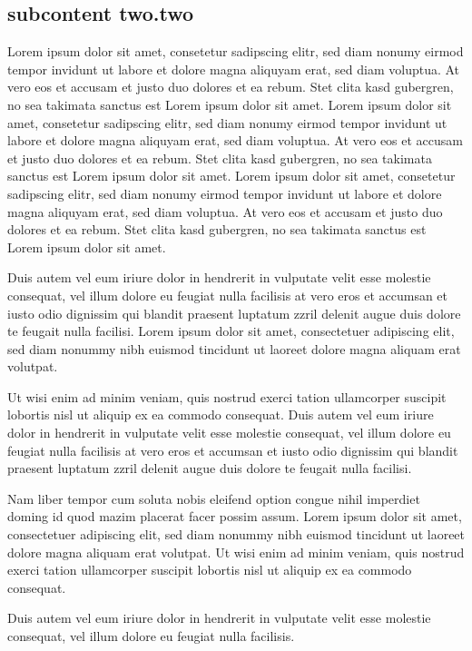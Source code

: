  \subsection{subcontent two.two}   

Lorem ipsum dolor sit amet, consetetur sadipscing elitr, sed diam nonumy eirmod
tempor invidunt ut labore et dolore magna aliquyam erat, sed diam voluptua. At
vero eos et accusam et justo duo dolores et ea rebum. Stet clita kasd gubergren,
no sea takimata sanctus est Lorem ipsum dolor sit amet. Lorem ipsum dolor sit
amet, consetetur sadipscing elitr, sed diam nonumy eirmod tempor invidunt ut
labore et dolore magna aliquyam erat, sed diam voluptua. At vero eos et accusam
et justo duo dolores et ea rebum. Stet clita kasd gubergren, no sea takimata
sanctus est Lorem ipsum dolor sit amet. Lorem ipsum dolor sit amet, consetetur
sadipscing elitr, sed diam nonumy eirmod tempor invidunt ut labore et dolore
magna aliquyam erat, sed diam voluptua. At vero eos et accusam et justo duo
dolores et ea rebum. Stet clita kasd gubergren, no sea takimata sanctus est
Lorem ipsum dolor sit amet.

Duis autem vel eum iriure dolor in hendrerit in vulputate velit esse molestie
consequat, vel illum dolore eu feugiat nulla facilisis at vero eros et accumsan
et iusto odio dignissim qui blandit praesent luptatum zzril delenit augue duis
dolore te feugait nulla facilisi. Lorem ipsum dolor sit amet, consectetuer
adipiscing elit, sed diam nonummy nibh euismod tincidunt ut laoreet dolore magna
aliquam erat volutpat.

Ut wisi enim ad minim veniam, quis nostrud exerci tation ullamcorper suscipit
lobortis nisl ut aliquip ex ea commodo consequat. Duis autem vel eum iriure
dolor in hendrerit in vulputate velit esse molestie consequat, vel illum dolore
eu feugiat nulla facilisis at vero eros et accumsan et iusto odio dignissim qui
blandit praesent luptatum zzril delenit augue duis dolore te feugait nulla
facilisi.

Nam liber tempor cum soluta nobis eleifend option congue nihil imperdiet doming
id quod mazim placerat facer possim assum. Lorem ipsum dolor sit amet,
consectetuer adipiscing elit, sed diam nonummy nibh euismod tincidunt ut laoreet
dolore magna aliquam erat volutpat. Ut wisi enim ad minim veniam, quis nostrud
exerci tation ullamcorper suscipit lobortis nisl ut aliquip ex ea commodo
consequat.

Duis autem vel eum iriure dolor in hendrerit in vulputate velit esse molestie
consequat, vel illum dolore eu feugiat nulla facilisis.

